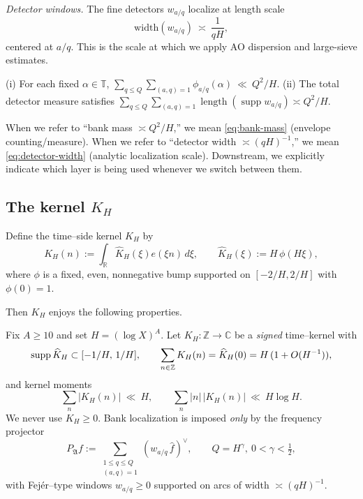 \emph{Detector windows.} The fine detectors $w_{a/q}$ localize at length scale
\begin{equation}\label{eq:detector-width}
\mathrm{width}(w_{a/q})\ \asymp\ \frac{1}{qH},
\end{equation}
centered at $a/q$. This is the scale at which we apply AO dispersion and large-sieve estimates.

\begin{lemma}\label{lem:bank-vs-detector}
(i) For each fixed $\alpha\in\mathbb T$,
\(
\sum_{q\le Q}\sum_{(a,q)=1}\phi_{a/q}(\alpha)\ \ll\ Q^2/H.
\)
(ii) The total detector measure satisfies
\(
\sum_{q\le Q}\sum_{(a,q)=1}\operatorname{length}(\operatorname{supp} w_{a/q})\asymp Q^2/H.
\)
\end{lemma}

\begin{remark}\label{rem:bank-detector-flag}
When we refer to “bank mass $\asymp Q^2/H$,” we mean \eqref{eq:bank-mass} (envelope counting/measure).
When we refer to “detector width $\asymp (qH)^{-1}$,” we mean \eqref{eq:detector-width} (analytic localization scale).
Downstream, we explicitly indicate which layer is being used whenever we switch between them.
\end{remark}


\subsection{The kernel \texorpdfstring{$K_H$}{KH}}

Define the time--side kernel $K_H$ by
\[
K_H(n) := \int_{\mathbb R} \widehat K_H(\xi) e(\xi n)\,d\xi,
\qquad \widehat K_H(\xi) := H\,\phi(H\xi),
\]
where $\phi$ is a fixed, even, nonnegative bump supported on $[-2/H,2/H]$
with $\phi(0)=1$.  

Then $K_H$ enjoys the following properties.

\begin{lemma}
\label{ass:signed-pin}
Fix $A\ge 10$ and set $H=(\log X)^A$. 
Let $K_H:\mathbb Z\to\mathbb C$ be a \emph{signed} time--kernel with
\[
\operatorname{supp}\widehat K_H \subset [-1/H,\,1/H],\qquad 
\sum_{n\in\mathbb Z}K_H(n)=\widehat K_H(0)= H\,(1+O(H^{-1})),
\]
and kernel moments
\[
\sum_{n}|K_H(n)|\ \ll\ H,\qquad \sum_{n}|n|\,|K_H(n)|\ \ll\ H\log H.
\]
We never use $K_H\ge 0$. Bank localization is imposed \emph{only} by the frequency projector
\[
P_{\mathfrak A}f := \sum_{\substack{1\le q\le Q\\(a,q)=1}} (w_{a/q}\,\widehat f)^{\vee}\!,\qquad 
Q=H^\gamma,\ 0<\gamma<\tfrac12,
\]
with Fejér--type windows $w_{a/q}\ge0$ supported on arcs of width $\asymp (qH)^{-1}$.
\end{lemma}

